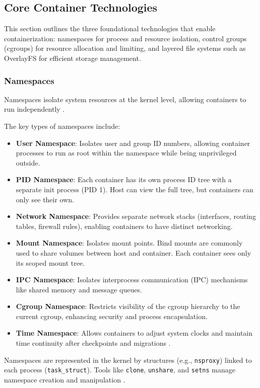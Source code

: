 \newpage
\subsection{Core Container Technologies}
This section outlines the three foundational technologies that enable containerization: namespaces for process and resource isolation, control groups (cgroups) for resource allocation and limiting, and layered file systems such as OverlayFS for efficient storage management.

\subsubsection{Namespaces}
Namespaces isolate system resources at the kernel level, allowing containers to run independently \citep{jainLinuxContainersVirtualization2023}.

The key types of namespaces include:
\begin{itemize}
    \item \textbf{User Namespace}: Isolates user and group ID numbers, allowing container processes to run as root within the namespace while being unprivileged outside.
    \item \textbf{PID Namespace}: Each container has its own process ID tree with a separate init process (PID 1).
       Host can view the full tree, but containers can only see their own.
    \item \textbf{Network Namespace}: Provides separate network stacks (interfaces, routing tables, firewall rules), enabling containers to have distinct networking.
    \item \textbf{Mount Namespace}: Isolates mount points. Bind mounts are commonly used to share volumes between host and container.
       Each container sees only its scoped mount tree.
    \item \textbf{IPC Namespace}: Isolates interprocess communication (IPC) mechanisms like shared memory and message queues.
    \item \textbf{Cgroup Namespace}: Restricts visibility of the cgroup hierarchy to the current cgroup, enhancing security and process encapsulation.
    \item \textbf{Time Namespace}: Allows containers to adjust system clocks and maintain time continuity after checkpoints and migrations \citep{jainLinuxContainersVirtualization2023}.
\end{itemize}
Namespaces are represented in the kernel by structures (e.g., \texttt{nsproxy}) linked to each process (\texttt{task\_struct}).
Tools like \texttt{clone}, \texttt{unshare}, and \texttt{setns} manage namespace creation and manipulation \citep{jainLinuxContainersVirtualization2023}.

